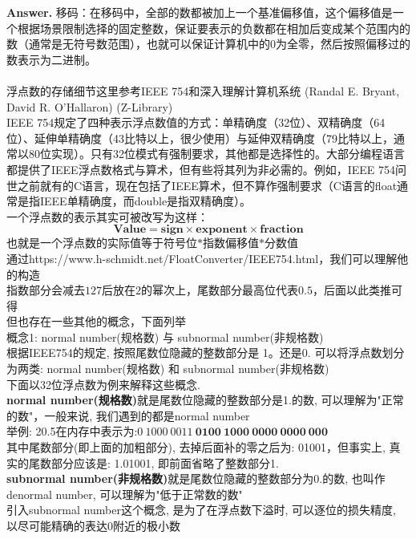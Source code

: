\documentclass[12pt, a4paper, oneside]{ctexart}
\newenvironment{solution}{\par\noindent\textbf{Answer. }}{\par}
\begin{document}
	\begin{solution}
		移码：在移码中，全部的数都被加上一个基准偏移值，这个偏移值是一个根据场景限制选择的固定整数，保证要表示的负数都在相加后变成某个范围内的数（通常是无符号数范围），也就可以保证计算机中的$0$为全零，然后按照偏移过的数表示为二进制。 \\ \\
		浮点数的存储细节这里参考IEEE 754和深入理解计算机系统 (Randal E. Bryant, David R. O’Hallaron) (Z-Library)\\
		IEEE 754规定了四种表示浮点数值的方式：单精确度（32位）、双精确度（64位）、延伸单精确度（43比特以上，很少使用）与延伸双精确度（79比特以上，通常以80位实现）。只有32位模式有强制要求，其他都是选择性的。大部分编程语言都提供了IEEE浮点数格式与算术，但有些将其列为非必需的。例如，IEEE 754问世之前就有的C语言，现在包括了IEEE算术，但不算作强制要求（C语言的float通常是指IEEE单精确度，而double是指双精确度）。 \\
		一个浮点数的表示其实可被改写为这样： 
		$$ \bm{Value = sign \times exponent \times fraction} $$
		也就是一个浮点数的实际值等于符号位$*$指数偏移值$*$分数值 \\
		通过https://www.h-schmidt.net/FloatConverter/IEEE754.html，我们可以理解他的构造 \\
		指数部分会减去$127$后放在$2$的幂次上，尾数部分最高位代表$0.5$，后面以此类推可得 \\
		但也存在一些其他的概念，下面列举 \\
		\Large 概念1: normal number(规格数) 与 subnormal number(非规格数) \\
		\normalsize 根据IEEE754的规定, 按照尾数位隐藏的整数部分是 1。还是0. 可以将浮点数划分为两类: normal number(规格数) 和 subnormal number(非规格数)\\
		下面以32位浮点数为例来解释这些概念.\\
		\textbf{normal number(规格数)}就是尾数位隐藏的整数部分是1.的数, 可以理解为"正常的数"，一般来说, 我们遇到的都是normal number \\
		举例: 20.5在内存中表示为:$ 0~1000~0011~\bm{0100}~\bm{1000}~\bm{0000}~\bm{0000}~\bm{000} $ \\
		其中尾数部分(即上面的加粗部分), 去掉后面补的零之后为: 01001，但事实上, 真实的尾数部分应该是: 1.01001, 即前面省略了整数部分1. \\
		\textbf{subnormal number(非规格数)}就是尾数位隐藏的整数部分为0.的数, 也叫作denormal number, 可以理解为"低于正常数的数"\\
		引入subnormal number这个概念, 是为了在浮点数下溢时, 可以逐位的损失精度, 以尽可能精确的表达0附近的极小数 \\

\end{solution}
\end{document}
